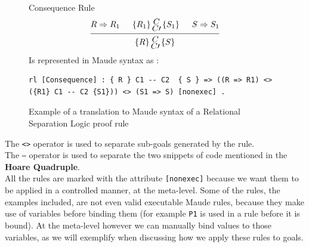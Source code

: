 \documentclass[12pt,a4paper]{article}
\newcommand{\hq}[4]{
	\left\{{#1}\right\}
	\let\scriptstyle\textstyle 
	\substack{{#2} \\ 	\let\scriptstyle\textstyle {#3}} 
	\left\{{#4}\right\}
}
\begin{document}
{\begin{figure}[h]
	Consequence Rule
	\[
	\begin{prooftree}
	\Hypo{R \Rightarrow R_1}
	\Hypo{\hq{R_1}{C}{C\prime}{S_1}}
	\Hypo{S \Rightarrow S_1}
	\Infer 3 {\hq{R}{C}{C\prime}{S}}
	\end{prooftree}	
	\]
	Is represented in Maude syntax as : 
	\begin{lstlisting}[caption=Relational Separation Logic Consequence rule]
	rl [Consequence] : { R } C1 -- C2  { S } => ((R => R1) <> ({R1} C1 -- C2 {S1})) <> (S1 => S) [nonexec] .
	\end{lstlisting}
	\caption{Example of a translation to Maude syntax of a Relational Separation Logic proof rule}
	\label{fig:RSLTranslation}
\end{figure}
The \texttt{<>} operator is used to separate sub-goals generated by the rule.
\\

The \texttt{---} operator is used to separate the two snippets of code mentioned in the \textbf{Hoare Quadruple}.
\\

All the rules are marked with the attribute \texttt{[nonexec]} because we want them to be applied in a controlled manner, at the meta-level. Some of the rules, the examples included, are not even valid executable Maude rules, because they make use of variables before binding them (for example \texttt{P1} is used in a rule before it is bound). At the meta-level however we can manually bind values to those variables, as we will exemplify when discussing how we apply these rules to goals.
}
\end{document}

